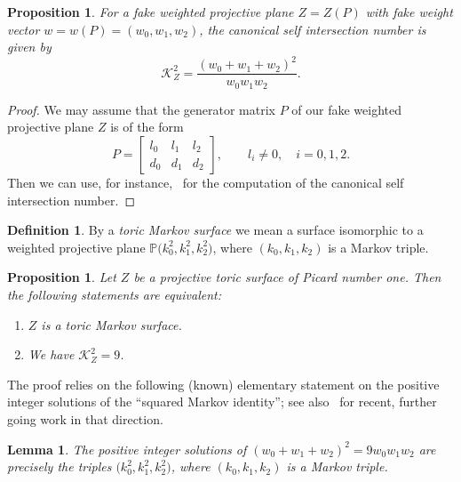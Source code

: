 \documentclass[pdftex]{sigma}
\newtheorem{lem}[thm]{Lemma}
\newtheorem{prop}[thm]{Proposition}
\theoremstyle{definition}
\newtheorem{defi}[thm]{Definition}
\def\PP{{\mathbb P}}
\begin{document}
\begin{prop}\label{prop:fwppKsquare}
For a fake weighted projective plane $Z = Z(P)$
with fake weight vector $w = w(P) = (w_0,w_1,w_2)$,
the canonical self intersection number is given by
\[
\mathcal{K}_Z^2
 =
\frac{(w_0+w_1+w_2)^2}{w_0w_1w_2}.
\]
\end{prop}


\begin{proof}
We may assume that the generator matrix $P$
of our fake weighted projective plane $Z$ is
of the form
\[
P
 =
\begin{bmatrix}
l_0 & l_1 & l_2
\\
d_0 & d_1 & d_2
\end{bmatrix},
\qquad
l_i \ne 0, \quad i = 0,1,2.
\]
Then we can use, for instance,~\cite[Remark~3.3]{HaHaSp}
for the computation of the canonical self intersection
number.
\end{proof}


\begin{defi}
By a \emph{toric Markov surface} we mean a surface
isomorphic to a weighted projective plane
$\PP\bigl(k_0^2,k_1^2,k_2^2\bigr)$, where $(k_0,k_1,k_2)$ is
a Markov triple.
\end{defi}


\begin{prop}
\label{prop:toricmarkovchar}
Let $Z$ be a projective toric surface of
Picard number one.
Then the following statements are equivalent:
\begin{enumerate}\itemsep=0pt
\item[$(i)$]
$Z$ is a toric Markov surface.
\item[$(ii)$]
We have $\mathcal{K}_Z^2 = 9$.
\end{enumerate}
\end{prop}


The proof relies on the following (known)
elementary statement on the positive integer
solutions of the ``squared Markov identity'';
see also~\cite{GyMa} for recent, further going
work in that direction.

\goodbreak

\begin{lem}
\label{lem:diophantic}
The positive integer solutions of $(w_0+w_1+w_2)^2 = 9w_0w_1w_2$
are precisely the triples $\bigl(k_0^2,k_1^2,k_2^2\bigr)$,
where $(k_0,k_1,k_2)$ is a Markov triple.
\end{lem}
\end{document}
